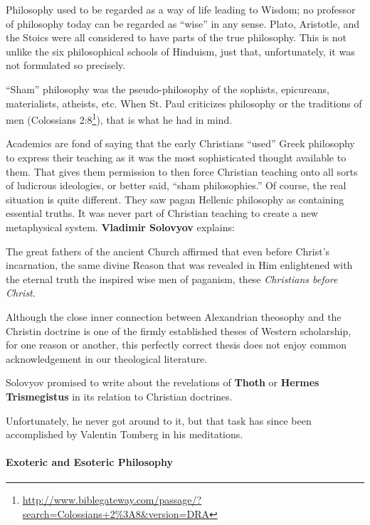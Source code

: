 Philosophy used to be regarded as a way of life leading to Wisdom; no professor of philosophy today can be regarded as ``wise'' in any sense. Plato, Aristotle, and the Stoics were all considered to have parts of the true philosophy. This is not unlike the six philosophical schools of Hinduism, just that, unfortunately, it was not formulated so precisely.

``Sham'' philosophy was the pseudo-philosophy of the sophists, epicureans, materialists, atheists, etc. When St. Paul criticizes philosophy or the traditions of men (Colossians 2:8\footnote{\url{http://www.biblegateway.com/passage/?search=Colossians+2\%3A8\&version=DRA}}), that is what he had in mind.

Academics are fond of saying that the early Christians ``used'' Greek philosophy to express their teaching as it was the most sophisticated thought available to them. That gives them permission to then force Christian teaching onto all sorts of ludicrous ideologies, or better said, ``sham philosophies.'' Of course, the real situation is quite different. They saw pagan Hellenic philosophy as containing essential truths. It was never part of Christian teaching to create a new metaphysical system. \textbf{Vladimir Solovyov} explains:

\begin{quotex}
The great fathers of the ancient Church affirmed that even before Christ's incarnation, the same divine Reason that was revealed in Him enlightened with the eternal truth the inspired wise men of paganism, these \emph{Christians before Christ}.

Although the close inner connection between Alexandrian theosophy and the Christin doctrine is one of the firmly established theses of Western scholarship, for one reason or another, this perfectly correct thesis does not enjoy common acknowledgement in our theological literature.
\end{quotex}


Solovyov promised to write about the revelations of \textbf{Thoth} or \textbf{Hermes Trismegistus} in its relation to Christian doctrines.

Unfortunately, he never got around to it, but that task has since been accomplished by Valentin Tomberg in his meditations.

\paragraph{Exoteric and Esoteric Philosophy}



